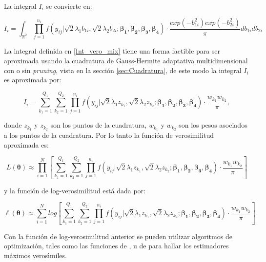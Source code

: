 La integral $I_i$ se convierte en:

\begin{equation}
I_i=\int_{\mathbb{R}^2}{\prod_{j=1}^{n_i}f(y_{ij}|\sqrt{2}\lambda_1b_{1i},\sqrt{2}\lambda_2 b_{2i};\boldsymbol{\beta_1}, \boldsymbol{\beta_2}, \boldsymbol{\beta_3}, \boldsymbol{\beta_4})\cdot \frac{exp(-b_{1i}^2) exp(-b_{2i}^2)}{\pi} db_{1i}db_{2i}}
\label{Int_vero_mix}
\end{equation}

La integral definida en \eqref{Int_vero_mix} tiene una forma factible para ser aproximada usando la cuadratura de Gauss-Hermite adaptativa multidimensional con o sin \textit{pruning}, vista en la secci\'{o}n \ref{sec:Cuadratura}, de este modo la integral $I_i$ es aproximada por:

\[
I_i=\sum_{k_1=1}^{Q_1}{\sum_{k_2=1}^{Q_2}{\prod_{j=1}^{n_i}f(y_{ij}|\sqrt{2}\lambda_1 z_{k_1},\sqrt{2}\lambda_2 z_{k_2};\boldsymbol{\beta_1}, \boldsymbol{\beta_2}, \boldsymbol{\beta_3}, \boldsymbol{\beta_4})\cdot \frac{w_{k_1}w_{k_2}}{\pi}}},
\]

donde $z_{k_1}$ y $z_{k_2}$ son los puntos de la cuadratura, $w_{k_1}$ y $w_{k_2}$ son los pesos asociados a los puntos de la cuadratura. Por lo tanto la funci\'{o}n de verosimilitud aproximada es:

\[
L(\boldsymbol{\theta}) \approx \prod_{i=1}^{N}{\left[\sum_{k_1=1}^{Q_1}{\sum_{k_2=1}^{Q_2}{\prod_{j=1}^{n_i}f(y_{ij}|\sqrt{2}\lambda_1 z_{k_1},\sqrt{2}\lambda_2 z_{k_2};\boldsymbol{\beta_1}, \boldsymbol{\beta_2}, \boldsymbol{\beta_3}, \boldsymbol{\beta_4})\cdot \frac{w_{k_1}w_{k_2}}{\pi}}}\right]}
\]

y la funci\'{o}n de log-verosimilitud est\'{a} dada por:

\begin{equation}
\ell(\boldsymbol{\theta}) \approx \sum_{i=1}^{N}log{\left[\sum_{k_1=1}^{Q_1}{\sum_{k_2=1}^{Q_2}{\prod_{j=1}^{n_i}f(y_{ij}|\sqrt{2}\lambda_1 z_{k_1},\sqrt{2}\lambda_2 z_{k_2};\boldsymbol{\beta_1}, \boldsymbol{\beta_2}, \boldsymbol{\beta_3}, \boldsymbol{\beta_4})\cdot \frac{w_{k_1}w_{k_2}}{\pi}}}\right]}
\label{LOG_vero_mix}
\end{equation}

Con la funci\'{o}n de log-verosimilitud anterior se pueden utilizar algoritmos de optimizaci\'{o}n, tales como las funciones de ,  u  de  para hallar los estimadores m\'{a}ximos veros\'{\i}miles.\\

